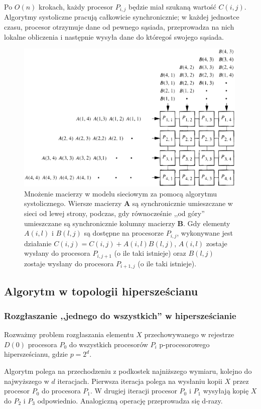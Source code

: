 Po \(O(n)\) krokach, każdy procesor \(P_{i,j}\) będzie miał szukaną wartość \(C(i,j)\).\\

Algorytmy systoliczne pracują całkowicie synchronicznie; w każdej jednostce czasu, procesor otrzymuje dane od pewnego sąsiada, przeprowadza na nich lokalne obliczenia i następnie wysyła dane do któregoś swojego sąsiada.

\begin{figure}[h]
\centering
\includegraphics[width=30em]{./images/systolic2.eps}
\caption{Mnożenie macierzy w modelu sieciowym za pomocą algorytmu systolicznego. Wiersze macierzy \(\mathbf{A}\) są synchronicznie umieszczane w sieci od lewej strony, podczas, gdy równocześnie ,,od góry'' umieszczane są synchronicznie kolumny macierzy \(\mathbf{B}\). Gdy elementy \(A(i,l)\) i \(B(l,j)\) są dostępne na procesorze \(P_{i,j}\), wykonywane jest działanie \(C(i,j)=C(i,j)+A(i,l)B(l,j)\), \(A(i,l)\) zostaje wysłany do procesora \(P_{i,j+1}\) (o ile taki istnieje) oraz \(B(l,j)\) zostaje wysłany do procesora \(P_{i+1,j}\) (o ile taki istnieje).}
\label{fig:systolic_mesh}
\end{figure}

\subsection{Algorytm w topologii hipersześcianu}
\subsubsection{Rozgłaszanie ,,jednego do wszystkich'' w hipersześcianie}
Rozważmy problem rozgłaszania elementu \(X\) przechowywanego w rejestrze \(D(0)\) procesora \(P_0\) do wszystkich procesorów \(P_i\) p-procesorowego hipersześcianu, gdzie \(p=2^d\).

Algorytm polega na przechodzeniu z podkostek najniższego wymiaru, kolejno do najwyższego w \(d\) iteracjach. Pierwsza iteracja polega na wysłaniu kopii \(X\) przez procesor \(P_0\) do procesora \(P_1\). W drugiej iteracji procesor \(P_0\) i \(P_1\) wysyłają kopię \(X\) do \(P_2\) i \(P_3\) odpowiednio. Analogiczną operację przeprowadza się d-razy.




